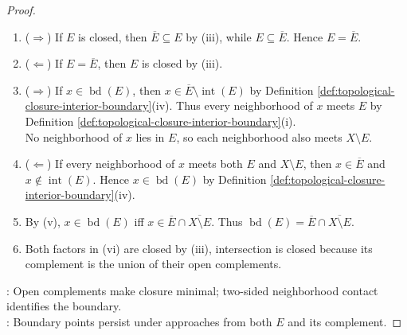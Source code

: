 \begin{proposition}
\begin{proof}
\begin{enumerate}[label=(\roman*)]
Hence $\overline{E}\subseteq F$, proving the smallest-closed-superset claim.
\item[$(iv)$] ($\Rightarrow$) If $E$ is closed, then $\overline{E}\subseteq E$ by (iii), while $E\subseteq\overline{E}$. Hence $E=\overline{E}$.
\item[$(iv)$] ($\Leftarrow$) If $E=\overline{E}$, then $E$ is closed by (iii).
\item[$(v)$] ($\Rightarrow$) If $x\in\operatorname{bd}(E)$, then $x\in\overline{E}\setminus\operatorname{int}(E)$ by Definition \ref{def:topological-closure-interior-boundary}(iv). Thus every neighborhood of $x$ meets $E$ by Definition \ref{def:topological-closure-interior-boundary}(i).\\
No neighborhood of $x$ lies in $E$, so each neighborhood also meets $X\setminus E$.
\item[$(v)$] ($\Leftarrow$) If every neighborhood of $x$ meets both $E$ and $X\setminus E$, then $x\in\overline{E}$ and $x\notin\operatorname{int}(E)$. Hence $x\in\operatorname{bd}(E)$ by Definition \ref{def:topological-closure-interior-boundary}(iv).
\item[$(vi)$] By (v), $x\in\operatorname{bd}(E)$ iff $x\in\overline{E}\cap\overline{X\setminus E}$. Thus $\operatorname{bd}(E)=\overline{E}\cap\overline{X\setminus E}$.
\item[$(vii)$] Both factors in (vi) are closed by (iii), intersection is closed because its complement is the union of their open complements.
\end{enumerate}
: Open complements make closure minimal; two-sided neighborhood contact identifies the boundary.\\
: Boundary points persist under approaches from both $E$ and its complement.
\end{proof}
\end{proposition}

